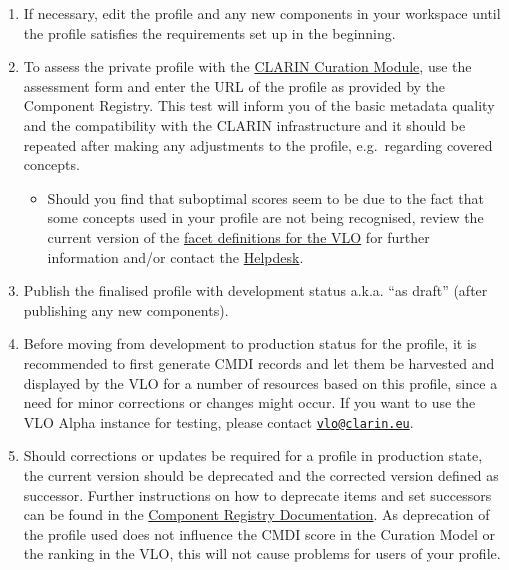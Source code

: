 \begin{enumerate}
\item
  If necessary, edit the profile and any new components in your
  workspace until the profile satisfies the requirements set up in the beginning.

\item
  To assess the private profile with the
  \href{https://clarin.oeaw.ac.at/curate/}{CLARIN Curation Module}, use the assessment form and enter the URL of the profile as provided by the Component Registry. This test will inform you of the basic metadata quality and the compatibility with the CLARIN infrastructure and it should be repeated after making any adjustments to the profile,  e.g.~regarding covered concepts.

\begin{itemize}
\tightlist
\item
  Should you find that suboptimal scores seem to be due to the fact that some concepts used in your profile are not being recognised, review the current version of the
  \href{https://github.com/clarin-eric/VLO/blob/master/vlo-commons/src/main/resources/facetConcepts.xml}{facet
  definitions for the VLO} for further information and/or contact the \href{mailto:vlo@clarin.eu}{Helpdesk}.
\end{itemize}

\item
  Publish the finalised profile with development status a.k.a. ``as draft'' (after publishing any new components).
\item
  Before moving from development to production status for the profile, it is recommended to first generate CMDI records and let them be harvested and displayed by the VLO for a number of resources based on this profile, since a need for minor corrections or changes might occur. If you want to use the VLO Alpha instance for testing, please contact \href{mailto:vlo@clarin.eu}{\nolinkurl{vlo@clarin.eu}}.
\item
  Should corrections or updates be required for a profile in production state, the current version should be deprecated and the corrected version defined as successor. Further instructions on how to deprecate items and set successors can be found in the \href{https://www.clarin.eu/content/component-registry-documentation}{Component Registry Documentation}. As deprecation of the profile used does not influence the CMDI score in the Curation Model or the ranking in the VLO, this will not cause problems for users of your profile.
\end{enumerate}
